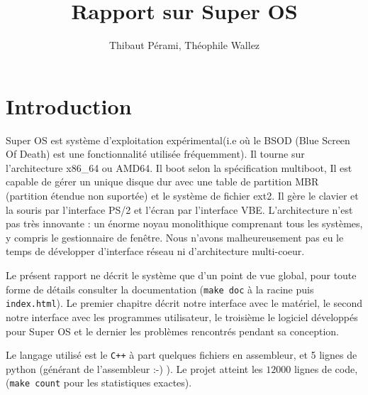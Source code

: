 \documentclass[12pt]{report}
\title{Rapport sur Super OS}
\author{Thibaut Pérami, Théophile Wallez}
\begin{document}
\maketitle

\tableofcontents

\chapter*{Introduction}

Super OS est système d'exploitation expérimental(i.e où le BSOD (Blue Screen Of
Death) est une fonctionnalité utilisée fréquemment). Il tourne sur
l'architecture x86\_64 ou AMD64. Il boot selon la spécification multiboot,
Il est capable de gérer un unique disque dur avec une table de partition MBR
(partition étendue non suportée) et le système de fichier ext2. Il gère le
clavier et la souris par l'interface PS/2 et l'écran par l'interface VBE.
L'architecture n'est pas très innovante : un énorme noyau monolithique comprenant
tous les systèmes, y compris le gestionnaire de fenêtre. Nous n'avons
malheureusement pas eu le temps de développer d'interface réseau ni
d'architecture multi-coeur.

Le présent rapport ne décrit le système que d'un point de vue global, pour toute
forme de détails consulter la documentation (\verb$make doc$ à la racine puis
\verb$index.html$). Le premier chapitre décrit notre interface avec le matériel,
le second notre interface avec les programmes utilisateur, le troisième le
logiciel développés pour Super OS et le dernier les problèmes rencontrés pendant
sa conception.

Le langage utilisé est le \verb$C++$ à part quelques fichiers en assembleur, et
5 lignes de python (générant de l'assembleur :-) ). Le projet atteint les $12 000$
lignes de code, (\verb$make count$ pour les statistiques exactes).
\end{document}
